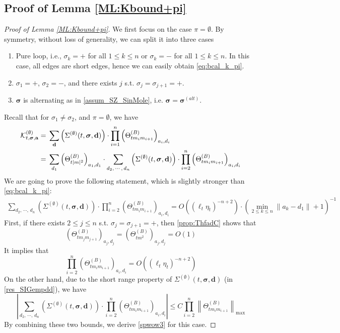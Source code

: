 \documentclass[10pt,reqno]{article}
\theoremstyle{plain} %
\theoremstyle{remark}
\numberwithin{equation}{section}
\begin{document}
\subsection{Proof of Lemma   \ref{ML:Kbound+pi}}

\begin{proof}[Proof of Lemma  \ref{ML:Kbound+pi}]
 We first focus on the case $\pi=\emptyset$. By symmetry, without loss of generality, we can split it into three cases
 \begin{enumerate}
     \item Pure loop, i.e., $\sigma_k=+$ for all $1\le k\le n$ or  $\sigma_k=-$ for all $1\le k\le n$. In this case, all edges are short edges, hence we can easily obtain \eqref{eq:bcal_k_pi}. 
     \item $\sigma_1=+$, $\sigma_2=-$, and  there exists $j$ s.t. $\sigma_j=\sigma_{j+1}=+$. 
    \item $\boldsymbol{\sigma}$ is alternating as in \eqref{assum_SZ_SinMole}, i.e. $\boldsymbol{\sigma}=\boldsymbol{\sigma}^{(alt)}$. 
 \end{enumerate}
  Recall  that for $\sigma_1\ne\sigma_2$, and $\pi=\emptyset$, we have 
\begin{align*}
{\cal K}^{(\emptyset)}_{t, \boldsymbol{\sigma}, \textbf{a}}
=\;&
 \sum_{\textbf{d}}\left(\Sigma^{(\emptyset)}(t, \boldsymbol{\sigma}, \textbf{d})\right)
\cdot 
\prod_{i=1}^n \left(\Theta^{(B)}_{tm_im_{i+1}}\right)_{a_i, d_i}
\\\nonumber
=\;&\sum_{d_1}\left(\Theta^{(B)}_{t|m|^2}\right)_{a_1, d_1}
\cdot \sum_{d_2,\,\cdots,\, d_n}\left(\Sigma^{(\emptyset)}(t, \boldsymbol{\sigma}, \textbf{d})\right)
\cdot 
\prod_{i=2}^n \left(\Theta^{(B)}_{tm_im_{i+1}}\right)_{a_i, d_i}  
\end{align*}
We are going to prove the following statement, which is  slightly stronger than \eqref{eq:bcal_k_pi}:
\begin{align}\label{spwow3}
    \sum_{d_2,\,\cdots,\, d_n}\left(\Sigma^{(\emptyset)}(t, \boldsymbol{\sigma}, \textbf{d})\right)
\cdot 
\prod_{i=2}^n \left(\Theta^{(B)}_{tm_im_{i+1}}\right)_{a_i, d_i}
=O((\ell_t\eta_t)^{-n+2})\cdot \left(\min_{2\le k\le n} \|a_k-d_1\|+1\right)^{-1}
\end{align}
First, if there exists $2\le j\le n$ s.t.  $\sigma_j=\sigma_{j+1}=+$, then  \eqref{prop:ThfadC} shows that  
$$
\left(\Theta^{(B)}_{tm_jm_{j+1}}\right)_{a_j, d_j}= \left(\Theta^{(B)}_{tm^2}\right)_{a_j, d_j}=O(1)
$$
It implies that
$$
\prod_{i=2}^n \left(\Theta^{(B)}_{tm_im_{i+1}}\right)_{a_i, d_i}=O((\ell_t\eta_t)^{-n+2})
$$
On the other hand, due to the short range property of $\Sigma^{(\emptyset)}(t, \boldsymbol{\sigma}, \textbf{d})$ (in \eqref{res_SIGempdd}), we have
$$
\left|\sum_{d_2,\,\cdots,\, d_n}\left(\Sigma^{(\emptyset)}(t, \boldsymbol{\sigma}, \textbf{d})\right)
\cdot 
\prod_{i=2}^n \left(\Theta^{(B)}_{tm_im_{i+1}}\right)_{a_i, d_i}\right|\le C \prod_{i=2}^n \left\|\Theta^{(B)}_{tm_im_{i+1}}\right\|_{\max}
$$
By combining these two bounds, we derive \eqref{spwow3} for this case.



\end{proof}
\end{document}
